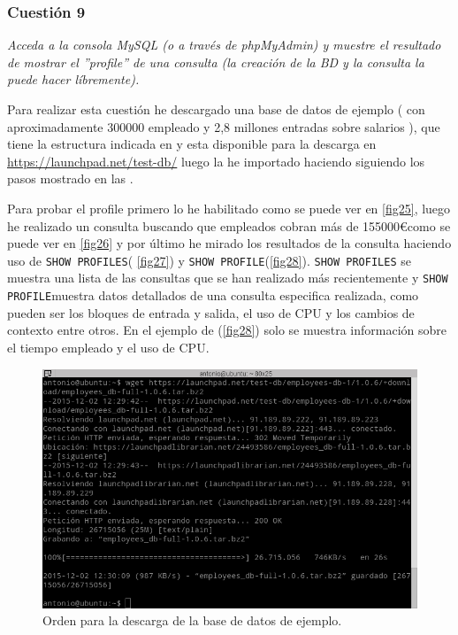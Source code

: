 \subsubsection{Cuestión 9}
\textit{Acceda a la consola MySQL (o a través de phpMyAdmin) y muestre el resultado de mostrar el ''profile'' de una consulta (la creación de la BD y la consulta la puede hacer líbremente).}
\newline

Para realizar esta cuestión he descargado una base de datos de ejemplo \cite{db}( con aproximadamente 300000 empleado y 2,8 millones entradas sobre salarios ), que tiene la estructura indicada en \cite{db1} y esta disponible para la descarga en \url{https://launchpad.net/test-db/} luego la he importado haciendo siguiendo los pasos mostrado en las .

Para probar el profile primero lo he habilitado como se puede ver en \cref{fig25}, luego he realizado un consulta buscando que empleados cobran más de 155000\euro como se puede ver en \cref{fig26} y por último he mirado los resultados de la consulta haciendo uso de \texttt{SHOW PROFILES}( \cref{fig27}) y \texttt{SHOW PROFILE}(\cref{fig28}). \texttt{SHOW PROFILES} se muestra una lista de las consultas que se han realizado más recientemente y \texttt{SHOW PROFILE}muestra datos detallados de una consulta especifica realizada, como pueden ser los bloques de entrada y salida, el uso de CPU y los cambios de contexto entre otros. En el ejemplo de (\cref{fig28}) solo se muestra información sobre el tiempo empleado y el uso de CPU. \cite{db2}

\begin{figure}[H]
  \begin{center}
    \includegraphics[width=1\textwidth]{imagenes/descarga}
    \caption{Orden para la descarga de la base de datos de ejemplo.}
    \label{fig22}
  \end{center}
\end{figure}

